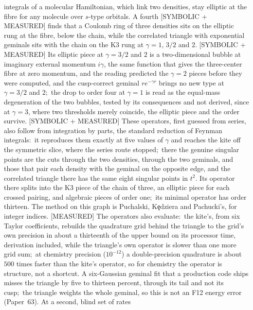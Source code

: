 \documentclass[aps,pra,twocolumn,superscriptaddress,longbibliography]{revtex4-2}
\newcommand{\gvc}[2]{#2}
\begin{document}
integrals of a molecular Hamiltonian, which link two densities, stay
elliptic at the fibre for any molecule over $s$-type orbitals.  A fourth [SYMBOLIC + MEASURED]
finds that \gvc{p59-coulomb-ring-elliptic}{a Coulomb ring of three densities sits on the elliptic rung at
the fibre, below the chain}, while \gvc{p59-correlated-triangle-k3}{the correlated triangle with exponential
geminals sits with the chain on the K3 rung at $\gamma=1$, $3/2$ and
$2$}.  [SYMBOLIC + MEASURED] Its elliptic piece at $\gamma=3/2$ and $2$ is
a two-dimensional bubble at imaginary external momentum $i\gamma$, the
same function that gives the three-center fibre at zero momentum, and
the reading predicted the $\gamma=2$ pieces before they were computed, and
the cusp-correct geminal $re^{-\gamma r}$ brings no new type at
$\gamma=3/2$ and $2$;\ the drop to order four at $\gamma=1$ is read as the
equal-mass degeneration of the two bubbles, tested by its consequences and
not derived, since at $\gamma=3$, where two
thresholds merely coincide, the elliptic piece and the order survive.
[SYMBOLIC + MEASURED] These operators, first guessed from series, also
follow from integration by parts, the standard reduction of Feynman
integrals:\ it reproduces them exactly at five values of $\gamma$ and reaches
the kite off the symmetric slice, where the series route stopped;\ there the
genuine singular points are the cuts through the two densities, through the
two geminals, and those that pair each density with the geminal on the
opposite edge, and the correlated triangle there has the same eight
singular points in $t^2$.  Its operator there splits into the K3 piece of the
chain of three, an elliptic piece for each crossed pairing, and algebraic
pieces of order one;\ its minimal operator has order thirteen.  The method on this graph is Puchalski, K\c{e}dziera
and Pachucki's, for integer indices.  [MEASURED] The operators also evaluate:\
the kite's, from six Taylor coefficients, rebuilds the quadrature grid behind
the triangle to the grid's own precision in about a thirteenth of the upper
bound on its processor time, derivation included, while the triangle's own
operator is slower than one more grid sum;\ at chemistry precision
($10^{-12}$) a double-precision quadrature is about $500$ times faster
than the kite's operator, so for chemistry the operator is structure, not
a shortcut.  A six-Gaussian geminal fit that a
production code ships misses the triangle by five to thirteen percent,
through its tail and not its cusp;\ the triangle weights the whole geminal,
so this is not an F12 energy error (Paper~63).  At a second, blind set of rates
\end{document}
